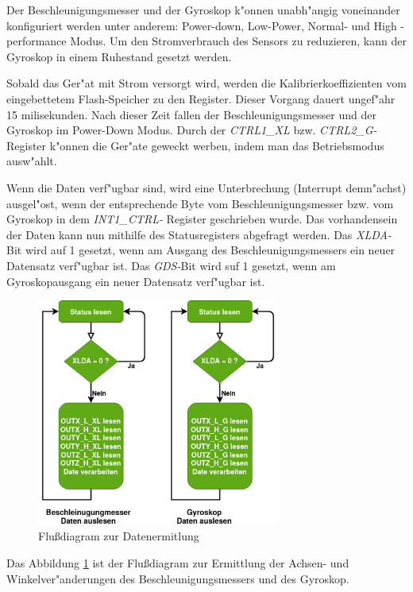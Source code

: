 Der Beschleunigungsmesser und der Gyroskop k"onnen unabh"angig 
voneinander konfiguriert werden unter anderem: Power-down, Low-Power, 
Normal- und High -performance Modus. Um den Stromverbrauch des Sensors 
zu reduzieren, kann der Gyroskop in einem Ruhestand gesetzt werden.


Sobald das Ger"at mit Strom versorgt wird, werden die 
Kalibrierkoeffizienten vom eingebettetem Flash-Speicher zu den  
Register. Dieser Vorgang dauert ungef"ahr 15 milisekunden. Nach dieser 
Zeit fallen der Beschleunigungsmesser und der Gyroskop im Power-Down 
Modus. Durch der \textit{CTRL1\_XL} bzw. \textit{CTRL2\_G-}Register 
k"onnen die Ger"ate geweckt werben, indem man das Betriebsmodus 
ausw"ahlt.

Wenn die Daten verf"ugbar sind, wird eine Unterbrechung (Interrupt 
demn"achst) ausgel"ost, wenn der entsprechende Byte vom 
Beschleunigungsmesser bzw. vom Gyroskop in dem \textit{INT1\_CTRL-} 
Register geschrieben wurde. Das vorhandensein der Daten kann nun mithilfe des Statusregisters abgefragt werden. Das \textit{XLDA-}Bit wird 
auf 1 gesetzt, wenn am Ausgang des Beschleunigungsmessers ein neuer 
Datensatz verf"ugbar ist. Das \textit{GDS-}Bit wird suf 1 gesetzt, wenn 
am Gyroskopausgang ein neuer Datensatz verf"ugbar ist.

\begin{figure}[h]
	\centering
	\includegraphics[width=8cm]{source/images/Gy_Acc_data}
	\caption{Flu\ss{}diagram zur Datenermitlung}\label{Gy_Acc_data}
\end{figure}

Das Abbildung \ref{Gy_Acc_data} ist der Flu\ss{}diagram zur Ermittlung 
der Achsen- und Winkelver"anderungen des Beschleunigungsmessers und des 
Gyroskop.

\vspace{10cm}

